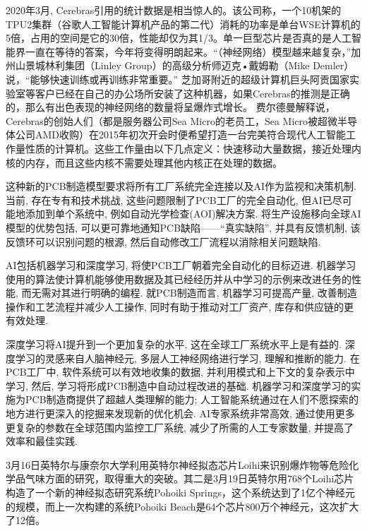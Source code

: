 2020年3月, Cerebras引用的统计数据是相当惊人的。该公司称，一个10机架的TPU2集群（谷歌人工智能计算机产品的第二代）消耗的功率是单台WSE计算机的5倍，占用的空间是它的30倍，性能却仅为其1/3。单一巨型芯片是否真的是人工智能界一直在等待的答案，今年将变得明朗起来。“（神经网络）模型越来越复杂，”加州山景城林利集团（Linley Group）的高级分析师迈克•戴姆勒（Mike Demler）说，“能够快速训练或再训练非常重要。”
芝加哥附近的超级计算机巨头阿贡国家实验室等客户已经在自己的办公场所安装了这种机器，如果Cerebras的推测是正确的，那么有出色表现的神经网络的数量将呈爆炸式增长。
费尔德曼解释说，Cerebras的创始人们（都是服务器公司Sea Micro的老员工，Sea Micro被超微半导体公司AMD收购）在2015年初次开会时便希望打造一台完美符合现代人工智能工作量性质的计算机。这些工作量由以下几点定义：快速移动大量数据，接近处理内核的内存，而且这些内核不需要处理其他内核正在处理的数据。

这种新的PCB制造模型要求将所有工厂系统完全连接以及AI作为监视和决策机制. 当前, 存在专有和技术挑战, 这些问题限制了PCB工厂的完全自动化, 但AI已尽可能地添加到单个系统中, 例如自动光学检查(AOI)解决方案. 将生产设施移向全球AI模型的优势包括, 可以更可靠地通知PCB缺陷——“真实缺陷”, 并具有反馈机制, 该反馈环可以识别问题的根源, 然后自动修改工厂流程以消除相关问题缺陷.

AI包括机器学习和深度学习, 将使PCB工厂朝着完全自动化的目标迈进. 机器学习使用的算法使计算机能够使用数据及其已经经历并从中学习的示例来改进任务的性能, 而无需对其进行明确的编程. 就PCB制造而言, 机器学习可提高产量, 改善制造操作和工艺流程并减少人工操作, 同时有助于推动对工厂资产, 库存和供应链的更有效处理.

深度学习将AI提升到一个更加复杂的水平, 这在全球工厂系统水平上是有益的. 深度学习的灵感来自人脑神经元, 多层人工神经网络进行学习, 理解和推断的能力. 在PCB工厂中, 软件系统可以有效地收集的数据, 并利用模式和上下文的复杂表示中学习, 然后, 学习将形成PCB制造中自动过程改进的基础.
机器学习和深度学习的实施为PCB制造商提供了超越人类理解的能力; 人工智能系统通过在人们不愿探索的地方进行更深入的挖掘来发现新的优化机会. AI专家系统非常高效, 通过使用更多更复杂的参数在全球范围内监控工厂系统, 减少了所需的人工专家数量, 并提高了效率和最佳实践.


3月16日英特尔与康奈尔大学利用英特尔神经拟态芯片Loihi来识别爆炸物等危险化学品气味方面的研究，取得重大的突破。其二是3月19日英特尔用768个Loihi芯片构造了一个新的神经拟态研究系统Pohoiki Springs，这个系统达到了1亿个神经元的规模，而上一次构建的系统Pohoiki Beach是64个芯片800万个神经元，这次扩大了12倍。



